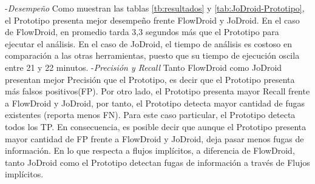 -\textit{Desempeño}\newline 
Como muestran las tablas \ref{tb:resultados} y \ref{tab:JoDroid-Prototipo}, el
Prototipo presenta mejor desempeño frente FlowDroid y JoDroid. En el caso de
FlowDroid, en promedio tarda 3,3 segundos más que el Prototipo para ejecutar el
análisis. En el caso de JoDroid, el tiempo de análisis es costoso en comparación
a las otras herramientas, puesto que su tiempo de ejecución oscila entre 21 y 22
minutos.\newline
-\textit{Precisión y Recall}\newline
Tanto FlowDroid como JoDroid presentan mejor Precisión que el Prototipo, es
decir que el Prototipo presenta más falsos positivos(FP).\newline 
Por otro lado, el Prototipo presenta mayor Recall frente a FlowDroid y JoDroid,
por tanto, el Prototipo detecta mayor cantidad de fugas existentes (reporta
menos FN).
Para este caso particular, el Prototipo detecta todos los TP.\newline 
En consecuencia, es posible decir que aunque el Prototipo presenta mayor
cantidad de FP frente a FlowDroid y JoDroid, deja pasar menos fugas de
información.\newline
En lo que respecta a flujos implícitos, a diferencia de FlowDroid, tanto JoDroid
como el Prototipo detectan fugas de información a través de Flujos
implícitos.

